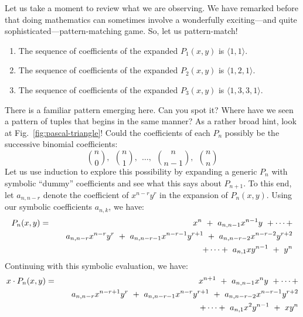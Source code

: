 Let us take a moment to review what we are observing.  We have remarked before that doing mathematics can sometimes involve a wonderfully exciting---and quite sophisticated---pattern-matching game.  So, let us pattern-match!
\begin{enumerate}
\item
The sequence of coefficients of the expanded $P_1(x,y)$ is $\langle 1,1 \rangle$.
\medskip\item
The sequence of coefficients of the expanded $P_2(x,y)$ is $\langle 1,2,1 \rangle$.
\medskip\item
The sequence of coefficients of the expanded $P_3(x,y)$ is $\langle 1,3,3,1 \rangle$.
\end{enumerate}
There is a familiar pattern emerging here.  Can you spot it?  Where have we seen a pattern of tuples that begins in the same manner?  As a rather broad hint, look at Fig.~\ref{fig:pascal-triangle}!  Could the coefficients of each $P_n$ possibly be the successive binomial coefficients:
\[ {n \choose 0}, \ \ {n \choose 1}, \ \ \ldots, \ \ {n \choose
  {n-1}}, \ \ {n \choose n}
\]
Let us use induction to explore this possibility by expanding a generic $P_n$ with symbolic ``dummy'' coefficients and see what this says about $P_{n+1}$.  To this end, let $a_{n,n-r}$ denote the coefficient of $x^{n-r} y^r$ in the expansion of $P_n(x,y)$.  Using our symbolic coefficients $a_{n,k}$, we have:
\begin{eqnarray*}
P_n(x,y) & = &
 x^n \ + \ a_{n,n-1} x^{n-1} y \ + \cdots + \\
         &   & \hspace*{.15in}
a_{n,n-r} x^{n-r} y^r \ + \ a_{n,n-r-1} x^{n-r-1} y^{r+1}
\ + \ a_{n,n-r-2} x^{n-r-2} y^{r+2} \\
         &   & \hspace*{.15in}
+ \cdots + \ a_{n,1} x y^{n-1} \ + \ y^n
\end{eqnarray*}
Continuing with this symbolic evaluation, we have:
\begin{eqnarray}
\nonumber
x \cdot P_n(x,y) & = &
 x^{n+1} \ + \ a_{n,n-1} x^n y \ + \cdots + \\
\nonumber
         &   & \hspace*{.15in}
a_{n,n-r} x^{n-r+1} y^r \ + \ a_{n,n-r-1} x^{n-r} y^{r+1}
\ + \ a_{n,n-r-2} x^{n-r-1} y^{r+2} \\
\label{eq:xPk}
         &   & \hspace*{.15in}
+ \cdots + \ a_{n,1} x^2 y^{n-1} \ + \ x y^n
\end{eqnarray}
